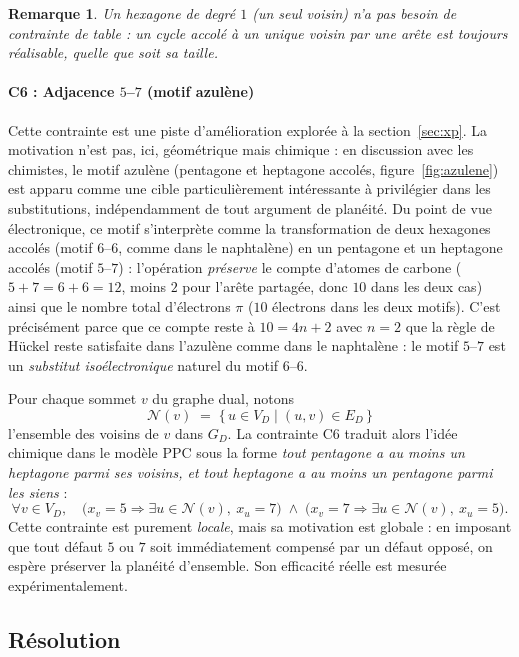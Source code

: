 \documentclass[11pt,a4paper]{article}
\newcommand{\GD}{\ensuremath{G_D}}                 %
\newtheorem{remarque}{Remarque}
\begin{document}
\begin{remarque}
Un hexagone de degré $1$ (un seul voisin) n'a pas besoin de contrainte de
table : un cycle accolé à un unique voisin par une arête est toujours
réalisable, quelle que soit sa taille.
\end{remarque}
\paragraph*{C6 : Adjacence $5$--$7$ (motif azulène)}
\label{sec:c7}

Cette contrainte est une piste d'amélioration explorée à la
section~\ref{sec:xp}. La motivation n'est pas, ici, géométrique mais
chimique : en discussion avec les chimistes, le motif azulène
(pentagone et heptagone accolés, figure~\ref{fig:azulene}) est apparu
comme une cible particulièrement intéressante à privilégier dans les
substitutions, indépendamment de tout argument de planéité. Du point
de vue électronique, ce motif s'interprète comme la transformation de
deux hexagones accolés (motif $6$--$6$, comme dans le naphtalène) en un
pentagone et un heptagone accolés (motif $5$--$7$) : l'opération
\emph{préserve} le compte d'atomes de carbone ($5 + 7 = 6 + 6 = 12$,
moins $2$ pour l'arête partagée, donc $10$ dans les deux cas) ainsi que
le nombre total d'électrons $\pi$ ($10$ électrons dans les deux motifs).
C'est précisément parce que ce compte reste à $10 = 4n+2$ avec $n=2$
que la règle de Hückel reste satisfaite dans l'azulène comme dans le
naphtalène : le motif $5$--$7$ est un \emph{substitut isoélectronique}
naturel du motif $6$--$6$.

Pour chaque sommet $v$ du graphe dual, notons
\[
  \mathcal{N}(v) \;=\; \{\, u \in V_D \mid (u, v) \in E_D \,\}
\]
l'ensemble des voisins de $v$ dans \GD{}. La contrainte C6 traduit
alors l'idée chimique dans le modèle PPC sous la forme
\emph{tout pentagone a au moins un heptagone parmi ses voisins, et tout
heptagone a au moins un pentagone parmi les siens} :
\[
  \forall v \in V_D,\quad
  \bigl( x_v = 5 \Rightarrow \exists u \in \mathcal{N}(v),\ x_u = 7 \bigr)
  \;\wedge\;
  \bigl( x_v = 7 \Rightarrow \exists u \in \mathcal{N}(v),\ x_u = 5 \bigr).
\]
Cette contrainte est purement \emph{locale}, mais sa motivation est globale :
en imposant que tout défaut $5$ ou $7$ soit immédiatement compensé par un
défaut opposé, on espère préserver la planéité d'ensemble. Son efficacité
réelle est mesurée expérimentalement.
\subsection{Résolution}
\end{document}
